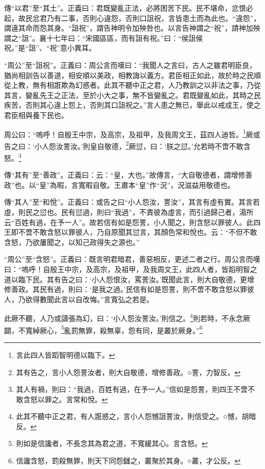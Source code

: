 {\noindent\zhuan{}\fzbyks 傳“以君”至“其土”。正義曰：君既變亂正法，必將困苦下民。民不堪命，忿恨必起，故民忿君乃有二事，否則心違怨，否則口詛祝，言皆患土而為此也。“違怨”，謂違其命而怨其身。“詛祝”，謂告神明令加殃咎也。以言告神謂之“祝”，請神加殃謂之“詛”。襄十七年曰：“宋國區區，而有詛有祝。”曰：“侯詛侯祝。”是“詛”、“祝”意小異耳。 \par}

{\noindent\shu{}\fzkt “周公”至“詛祝”。正義曰：周公言而嘆曰：“我聞人之言曰，古人之雖君明臣良，猶尚相訓告以善道，相安順以美政，相教誨以義方。君臣相正如此，故於時之民順從上教，無有相誑欺為幻惑者。此其不聽中正之君，人乃教訓之以非法之事，乃從其言，變亂先王之正法，至於小大之事，無不皆變亂之。君既變亂如此，其時之民疾苦，否則其心違上怨上，否則其口詛祝之。”言人患之無已，舉此以戒成王，使之君臣相與養下民也。 \par}

周公曰：“嗚呼！自殷王中宗，及高宗，及祖甲，及我周文王，茲四人迪哲。\footnote{言此四人皆蹈智明德以臨下。}厥或告之曰：‘小人怨汝詈汝。’則皇自敬德，\footnote{其有告之，言小人怨詈汝者，則大自敬德，增修善政。○詈，力智反。}厥愆，曰：‘朕之愆。’允若時不啻不敢含怒。\footnote{其人有禍，則曰：“我過，百姓有過，在予一人。”信如是怨詈，則四王不啻不敢含怒以罪之。言常和悅。}


{\noindent\zhuan{}\fzbyks 傳“其有”至“善政”。正義曰：云：“皇，大也。”故傳言，“大自敬德者，謂增修善政”也。以“皇”為暇，言寬暇自敬。王肅本“皇”作“況”，況滋益用敬德也。 \par}

{\noindent\zhuan{}\fzbyks 傳“其人”至“和悅”。正義曰：或告之曰“小人怨汝，詈汝”，其言有虛有實。其言若虛，則民之愆也。民有愆過，則曰“我過”，不責彼為虛言，而引過歸己者，湯所云“百姓有過，在予一人”。故若信有如是怨詈，小人聞之，則含怒以罪彼人。此四王即不啻不敢含怒以罪彼人，乃自原聞其愆言，其顏色常和悅也。云：“不但不敢含怒，乃欲屢聞之，以知己政得失之源也。” \par}

{\noindent\shu{}\fzkt “周公”至“含怒”。正義曰：既言明君暗君，善惡相反，更述二者之行。周公言而嘆曰：“嗚呼！自殷王中宗，及高宗，及祖甲，及我周文王，此四人者，皆蹈明智之道以臨下民。其有告之曰：‘小人怨恨汝，罵詈汝。’既聞此言，則大自敬德，更增修善政。其民有過，則曰：‘是我之過。’民信有如是怨詈，則不啻不敢含怒以罪彼人，乃欲得數聞此言以自改悔。”言寬弘之若是。 \par}

此厥不聽，人乃或譸張為幻，曰：‘小人怨汝詈汝。’則信之。\footnote{此其不聽中正之君，有人誑惑之，言小人怨憾詛詈汝，則信受之。○憾，胡暗反。}則若時，不永念厥闢，不寬綽厥心，\footnote{則如是信讒者，不長念其為君之道，不寬緩其心。言含怒。}亂罰無罪，殺無辜，怨有同，是叢於厥身。”\footnote{信讒含怒，罰殺無罪，則天下同怨讎之，叢聚於其身。○叢，才公反。}


